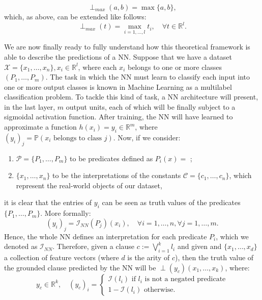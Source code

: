 \begin{equation*}
\perp_{max}(a,b) = \max\{a,b\},
\end{equation*}
which, as above, can be extended like follows:
\begin{equation*}
\perp_{max}(t) = \max_{i=1,\dots,l} t_i, \quad \forall t \in \mathbb{R}^l.
\end{equation*}

We are now finally ready to fully understand how this theoretical framework is able to describe the predictions of a NN. Suppose that we have a dataset $\mathcal{X}=\{x_1, \dots, x_n\}, x_i\in\mathbb{R}^l$, where each $x_i$ belongs to one or more classes $\left( P_1, \dots, P_m \right)$. The task in which the NN must learn to classify each input into one or more output classes is known  in Machine Learning as a multilabel classification problem. To tackle this kind of task, a NN architecture will present, in the last layer, $m$ output units, each of which will be finally subject to a sigmoidal activation function. After training, the NN will have learned to approximate a function $h(x_i) = y_i \in \mathbb{R}^m$, where $(y_i)_j = \mathbb{P}(x_i\text{ belongs to class }j).$ Now, if we consider:
\begin{enumerate}
	\item $\mathcal{P} = \{P_1,\dots,P_m\}$ to be predicates defined as $P_i(x) = $ ;
	\item $\{x_1,\dots, x_n\}$ to be the interpretations of the constants $\mathcal{C} = \{c_1,\dots,c_n\}$, which represent the real-world objects of our dataset,
\end{enumerate}  it is clear that the entries of $y_i$ can be seen as truth values of the predicates $\{P_1,\dots,P_m\}$. More formally:
\begin{equation}
(y_i)_j = \mathcal{I}_{NN}(P_j)(x_i), \quad \forall i=1,\dots,n, \forall j=1,\dots,m.
\end{equation}
Hence, the whole NN defines an interpretation for each predicate $P_i$, which we denoted as $\mathcal{I}_{NN}$. Therefore, given a clause $c := \bigvee_{i=1}^k l_i$ and given and $\{x_1,\dots,x_d\}$ a collection of feature vectors (where $d$ is the arity of $c$), then the truth value of the grounded clause predicted by the NN will be $\perp(y_c)(x_1,\dots,x_k)$, where:
\begin{equation}
y_c \in \mathbb{R}^k, \quad(y_c)_i = \begin{cases}
\mathcal{I}(l_i) \text{ if } l_i \text{ is not a negated predicate}\\
1-\mathcal{I}(l_i) \text{ otherwise.}
\end{cases}
\end{equation}

